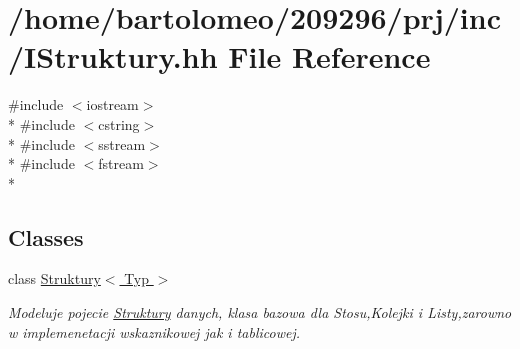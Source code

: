 \hypertarget{_i_struktury_8hh}{\section{/home/bartolomeo/209296/prj/inc/\-I\-Struktury.hh File Reference}
\label{_i_struktury_8hh}
}
{\ttfamily \#include $<$iostream$>$}\\*
{\ttfamily \#include $<$cstring$>$}\\*
{\ttfamily \#include $<$sstream$>$}\\*
{\ttfamily \#include $<$fstream$>$}\\*
\subsection*{Classes}
\begin{DoxyCompactItemize}
\item 
class \hyperlink{class_struktury}{Struktury$<$ Typ $>$}
\begin{DoxyCompactList}\small\item\em Modeluje pojecie \hyperlink{class_struktury}{Struktury} danych, klasa bazowa dla Stosu,Kolejki i Listy,zarowno w implemenetacji wskaznikowej jak i tablicowej. \end{DoxyCompactList}\end{DoxyCompactItemize}

